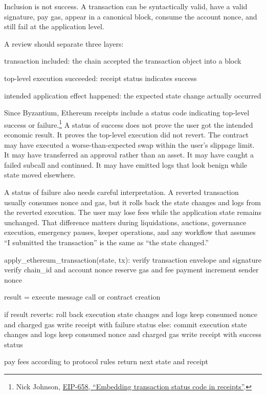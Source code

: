 Inclusion is not success. A transaction can be syntactically valid, have a valid signature, pay gas, appear in a canonical block, consume the account nonce, and still fail at the application level.

A review should separate three layers:

\begin{codeblock}
transaction included:
    the chain accepted the transaction object into a block

top-level execution succeeded:
    receipt status indicates success

intended application effect happened:
    the expected state change actually occurred
\end{codeblock}

Since Byzantium, Ethereum receipts include a status code indicating top-level success or failure.\footnote{Nick Johnson, \href{https://eips.ethereum.org/EIPS/eip-658}{EIP-658, ``Embedding transaction status code in receipts''}.} A status of success does not prove the user got the intended economic result. It proves the top-level execution did not revert. The contract may have executed a worse-than-expected swap within the user's slippage limit. It may have transferred an approval rather than an asset. It may have caught a failed subcall and continued. It may have emitted logs that look benign while state moved elsewhere.

A status of failure also needs careful interpretation. A reverted transaction usually consumes nonce and gas, but it rolls back the state changes and logs from the reverted execution. The user may lose fees while the application state remains unchanged. That difference matters during liquidations, auctions, governance execution, emergency pauses, keeper operations, and any workflow that assumes ``I submitted the transaction'' is the same as ``the state changed.''

\begin{codeblock}
apply_ethereum_transaction(state, tx):
    verify transaction envelope and signature
    verify chain_id and account nonce
    reserve gas and fee payment
    increment sender nonce

    result = execute message call or contract creation

    if result reverts:
        roll back execution state changes and logs
        keep consumed nonce and charged gas
        write receipt with failure status
    else:
        commit execution state changes and logs
        keep consumed nonce and charged gas
        write receipt with success status

    pay fees according to protocol rules
    return next state and receipt
\end{codeblock}

